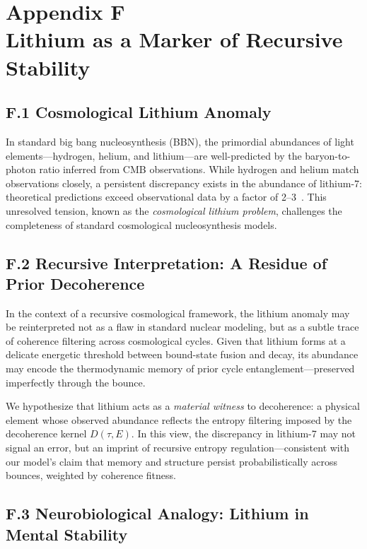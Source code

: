 \section*{Appendix F\\Lithium as a Marker of Recursive Stability}
\label{appendix:F}

\subsection*{F.1 Cosmological Lithium Anomaly}

In standard big bang nucleosynthesis (BBN), the primordial abundances of light elements—hydrogen, helium, and lithium—are well-predicted by the baryon-to-photon ratio inferred from CMB observations. While hydrogen and helium match observations closely, a persistent discrepancy exists in the abundance of lithium-7: theoretical predictions exceed observational data by a factor of 2–3~\cite{fields2020bbn}. This unresolved tension, known as the \textit{cosmological lithium problem}, challenges the completeness of standard cosmological nucleosynthesis models.

\subsection*{F.2 Recursive Interpretation: A Residue of Prior Decoherence}

In the context of a recursive cosmological framework, the lithium anomaly may be reinterpreted not as a flaw in standard nuclear modeling, but as a subtle trace of coherence filtering across cosmological cycles. Given that lithium forms at a delicate energetic threshold between bound-state fusion and decay, its abundance may encode the thermodynamic memory of prior cycle entanglement—preserved imperfectly through the bounce.

We hypothesize that lithium acts as a \textit{material witness} to decoherence: a physical element whose observed abundance reflects the entropy filtering imposed by the decoherence kernel \( D(\tau, E) \). In this view, the discrepancy in lithium-7 may not signal an error, but an imprint of recursive entropy regulation—consistent with our model’s claim that memory and structure persist probabilistically across bounces, weighted by coherence fitness.

\subsection*{F.3 Neurobiological Analogy: Lithium in Mental Stability}

